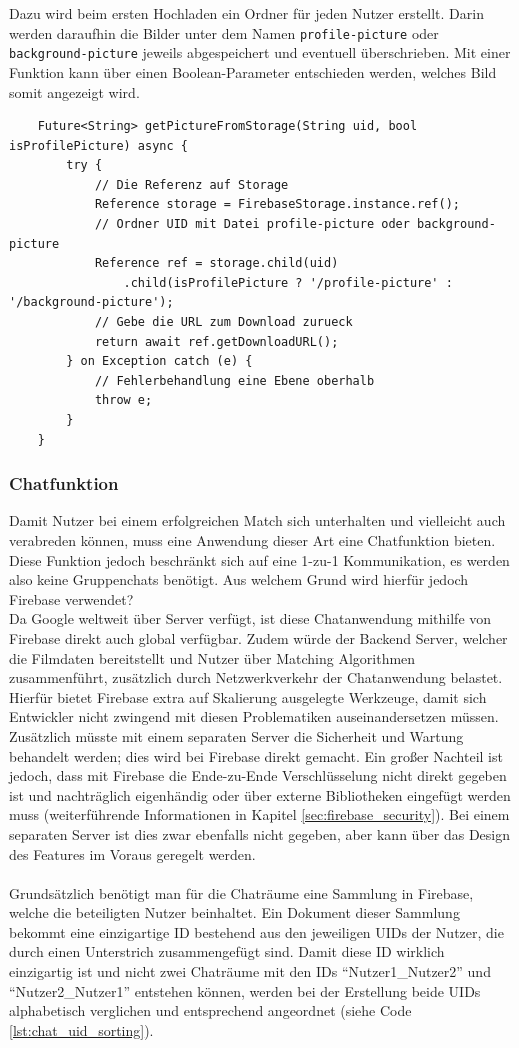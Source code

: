 Dazu wird beim ersten Hochladen ein Ordner für jeden Nutzer erstellt.
Darin werden daraufhin die Bilder unter dem Namen \texttt{profile-picture} oder \texttt{background-picture} jeweils abgespeichert und eventuell überschrieben.
Mit einer Funktion kann über einen Boolean-Parameter entschieden werden, welches Bild somit angezeigt wird.
\medspace
\begin{lstlisting}
	Future<String> getPictureFromStorage(String uid, bool isProfilePicture) async {
		try {
			// Die Referenz auf Storage
			Reference storage = FirebaseStorage.instance.ref();
			// Ordner UID mit Datei profile-picture oder background-picture
			Reference ref = storage.child(uid)
				.child(isProfilePicture ? '/profile-picture' : '/background-picture');
			// Gebe die URL zum Download zurueck
			return await ref.getDownloadURL();
		} on Exception catch (e) {
			// Fehlerbehandlung eine Ebene oberhalb
			throw e;
		}
	}
\end{lstlisting}
\medspace
\subsubsection{Chatfunktion}
Damit Nutzer bei einem erfolgreichen Match sich unterhalten und vielleicht auch verabreden können, muss eine Anwendung dieser Art eine Chatfunktion bieten.
Diese Funktion jedoch beschränkt sich auf eine 1-zu-1 Kommunikation, es werden also keine Gruppenchats benötigt.
Aus welchem Grund wird hierfür jedoch Firebase verwendet?\\

\noindent
Da Google weltweit über Server verfügt, ist diese Chatanwendung mithilfe von Firebase direkt auch global verfügbar.
Zudem würde der Backend Server, welcher die Filmdaten bereitstellt und Nutzer über Matching Algorithmen zusammenführt, zusätzlich durch Netzwerkverkehr der Chatanwendung belastet.
Hierfür bietet Firebase extra auf Skalierung ausgelegte Werkzeuge, damit sich Entwickler nicht zwingend mit diesen Problematiken auseinandersetzen müssen.
Zusätzlich müsste mit einem separaten Server die Sicherheit und Wartung behandelt werden; dies wird bei Firebase direkt gemacht.
Ein großer Nachteil ist jedoch, dass mit Firebase die Ende-zu-Ende Verschlüsselung nicht direkt gegeben ist und nachträglich eigenhändig oder über externe Bibliotheken eingefügt werden muss (weiterführende Informationen in Kapitel \ref{sec:firebase_security}).
Bei einem separaten Server ist dies zwar ebenfalls nicht gegeben, aber kann über das Design des Features im Voraus geregelt werden.\\
\\
\noindent
Grundsätzlich benötigt man für die Chaträume eine Sammlung in Firebase, welche die beteiligten Nutzer beinhaltet. 
Ein Dokument dieser Sammlung bekommt eine einzigartige ID bestehend aus den jeweiligen UIDs der Nutzer, die durch  einen Unterstrich zusammengefügt sind.
Damit diese ID wirklich einzigartig ist und nicht zwei Chaträume mit den IDs \enquote{Nutzer1\_Nutzer2} und \enquote{Nutzer2\_Nutzer1} entstehen können, werden bei der Erstellung beide UIDs alphabetisch verglichen und entsprechend angeordnet (siehe Code \ref{lst:chat_uid_sorting}).\\


